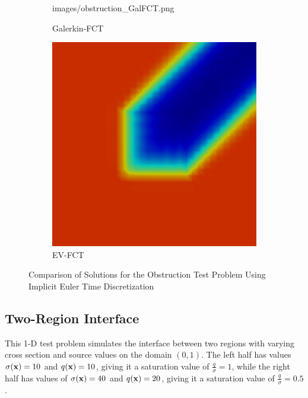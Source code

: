 \begin{figure}[ht]
\begin{subfigure}{0.3\textwidth}
        {images/obstruction_GalFCT.png}
      \caption{Galerkin-FCT}
   \end{subfigure}
   \begin{subfigure}{0.3\textwidth}
      \includegraphics[width=\textwidth]
        {images/obstruction_EVFCT.png}
      \caption{EV-FCT}
   \end{subfigure}
   \caption{Comparison of Solutions for the Obstruction Test
     Problem Using Implicit Euler Time Discretization}
   \label{fig:obstruction_be}
\end{figure}
\clearpage
\subsection{Two-Region Interface}
This 1-D test problem simulates the interface between two regions with
varying cross section and source values on the domain $(0,1)$.
The left half has values $\sigma(\mathbf{x})=10$ and $q(\mathbf{x})=10$, giving it a
saturation value of $\frac{q}{\sigma}=1$, while the right half has values
of $\sigma(\mathbf{x})=40$ and $q(\mathbf{x})=20$, giving it a saturation value of
$\frac{q}{\sigma}=0.5$.

